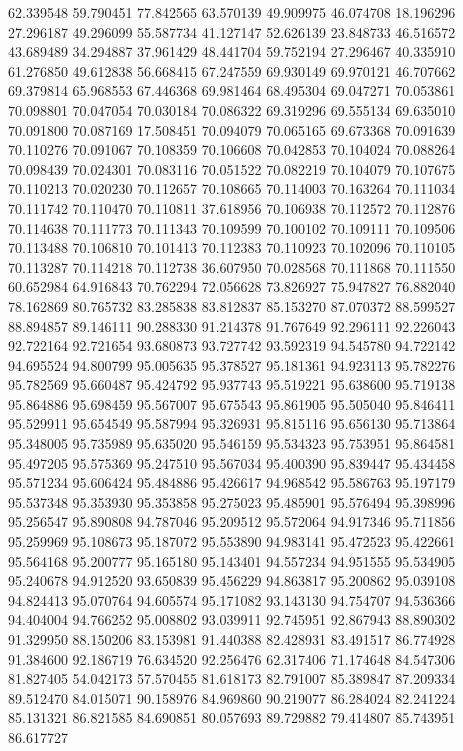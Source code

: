 62.339548
59.790451
77.842565
63.570139
49.909975
46.074708
18.196296
27.296187
49.296099
55.587734
41.127147
52.626139
23.848733
46.516572
43.689489
34.294887
37.961429
48.441704
59.752194
27.296467
40.335910
61.276850
49.612838
56.668415
67.247559
69.930149
69.970121
46.707662
69.379814
65.968553
67.446368
69.981464
68.495304
69.047271
70.053861
70.098801
70.047054
70.030184
70.086322
69.319296
69.555134
69.635010
70.091800
70.087169
17.508451
70.094079
70.065165
69.673368
70.091639
70.110276
70.091067
70.108359
70.106608
70.042853
70.104024
70.088264
70.098439
70.024301
70.083116
70.051522
70.082219
70.104079
70.107675
70.110213
70.020230
70.112657
70.108665
70.114003
70.163264
70.111034
70.111742
70.110470
70.110811
37.618956
70.106938
70.112572
70.112876
70.114638
70.111773
70.111343
70.109599
70.100102
70.109111
70.109506
70.113488
70.106810
70.101413
70.112383
70.110923
70.102096
70.110105
70.113287
70.114218
70.112738
36.607950
70.028568
70.111868
70.111550
60.652984
64.916843
70.762294
72.056628
73.826927
75.947827
76.882040
78.162869
80.765732
83.285838
83.812837
85.153270
87.070372
88.599527
88.894857
89.146111
90.288330
91.214378
91.767649
92.296111
92.226043
92.722164
92.721654
93.680873
93.727742
93.592319
94.545780
94.722142
94.695524
94.800799
95.005635
95.378527
95.181361
94.923113
95.782276
95.782569
95.660487
95.424792
95.937743
95.519221
95.638600
95.719138
95.864886
95.698459
95.567007
95.675543
95.861905
95.505040
95.846411
95.529911
95.654549
95.587994
95.326931
95.815116
95.656130
95.713864
95.348005
95.735989
95.635020
95.546159
95.534323
95.753951
95.864581
95.497205
95.575369
95.247510
95.567034
95.400390
95.839447
95.434458
95.571234
95.606424
95.484886
95.426617
94.968542
95.586763
95.197179
95.537348
95.353930
95.353858
95.275023
95.485901
95.576494
95.398996
95.256547
95.890808
94.787046
95.209512
95.572064
94.917346
95.711856
95.259969
95.108673
95.187072
95.553890
94.983141
95.472523
95.422661
95.564168
95.200777
95.165180
95.143401
94.557234
94.951555
95.534905
95.240678
94.912520
93.650839
95.456229
94.863817
95.200862
95.039108
94.824413
95.070764
94.605574
95.171082
93.143130
94.754707
94.536366
94.404004
94.766252
95.008802
93.039911
92.745951
92.867943
88.890302
91.329950
88.150206
83.153981
91.440388
82.428931
83.491517
86.774928
91.384600
92.186719
76.634520
92.256476
62.317406
71.174648
84.547306
81.827405
54.042173
57.570455
81.618173
82.791007
85.389847
87.209334
89.512470
84.015071
90.158976
84.969860
90.219077
86.284024
82.241224
85.131321
86.821585
84.690851
80.057693
89.729882
79.414807
85.743951
86.617727
